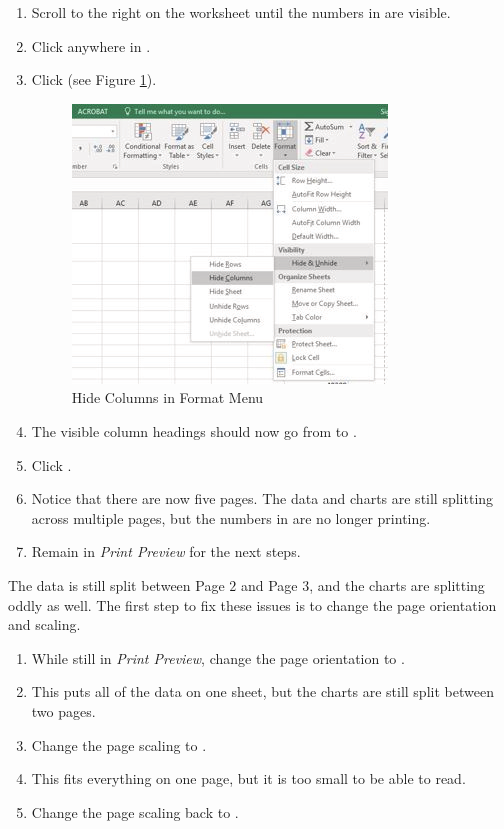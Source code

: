 \begin{enumerate}
	\item Scroll to the right on the worksheet until the numbers in  are visible.
	\item Click anywhere in .
	\item Click  (see Figure \ref{04:fig52}).
	
	\begin{figure}[H]
		\centering
		\includegraphics[width=\maxwidth{.95\linewidth}]{gfx/ch04_fig52}
		\caption{Hide Columns in Format Menu}
		\label{04:fig52}
	\end{figure}
		
	\item The visible column headings should now go from  to .
	\item Click .
	\item Notice that there are now five pages. The data and charts are still splitting across multiple pages, but the numbers in  are no longer printing.
	\item Remain in \textit{Print Preview} for the next steps.
\end{enumerate}


The data is still split between Page $ 2 $ and Page $ 3 $, and the charts are splitting oddly as well. The first step to fix these issues is to change the page orientation and scaling.

\begin{enumerate}
	\item While still in \textit{Print Preview}, change the page orientation to .
	\item This puts all of the data on one sheet, but the charts are still split between two pages.
	\item Change the page scaling to .
	\item This fits everything on one page, but it is too small to be able to read.
	\item Change the page scaling back to .
\end{enumerate}

